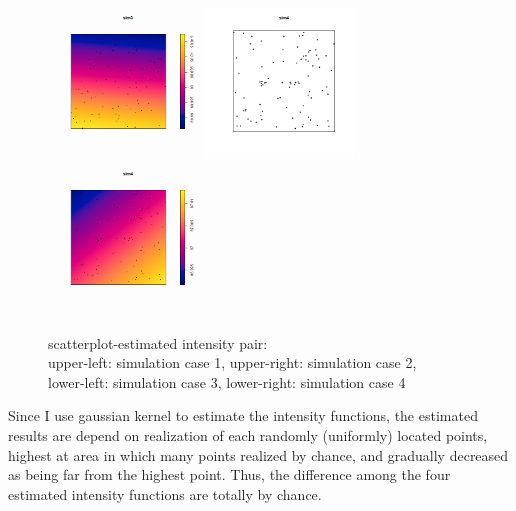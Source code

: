\documentclass{article}
\begin{document}
\begin{figure}[!h]
    \includegraphics[width=4cm]{prob2_sim3_ker.png}
    \includegraphics[width=4cm]{prob2_sim4_scatterplot.png}
    \includegraphics[width=4cm]{prob2_sim4_ker.png}
    \caption{scatterplot-estimated intensity pair: \\
    upper-left: simulation case 1, upper-right: simulation case 2, \\
    lower-left: simulation case 3, lower-right: simulation case 4}
\end{figure}

Since I use gaussian kernel to estimate the intensity functions, 
the estimated results are depend on realization of each randomly (uniformly) located points,
highest at area in which many points realized by chance, and gradually decreased as being far from the highest point.
Thus, the difference among the four estimated intensity functions are totally by chance.


\clearpage
\end{document}
